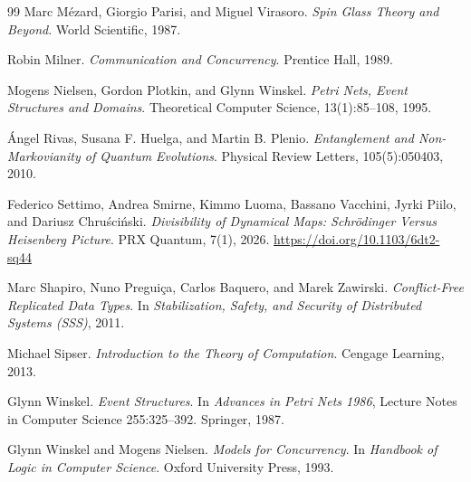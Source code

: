 \documentclass[12pt]{article}
\begin{document}
\begin{thebibliography}{99}
Marc M\'ezard, Giorgio Parisi, and Miguel Virasoro.
\textit{Spin Glass Theory and Beyond}.
World Scientific, 1987.

Robin Milner.
\textit{Communication and Concurrency}.
Prentice Hall, 1989.

Mogens Nielsen, Gordon Plotkin, and Glynn Winskel.
\textit{Petri Nets, Event Structures and Domains}.
Theoretical Computer Science, 13(1):85--108, 1995.

\'Angel Rivas, Susana F. Huelga, and Martin B. Plenio.
\textit{Entanglement and Non-Markovianity of Quantum Evolutions}.
Physical Review Letters, 105(5):050403, 2010.

Federico Settimo, Andrea Smirne, Kimmo Luoma, Bassano Vacchini,
Jyrki Piilo, and Dariusz Chru\'sci\'nski.
\textit{Divisibility of Dynamical Maps: Schr{\"o}dinger Versus Heisenberg Picture}.
PRX Quantum, 7(1), 2026.
\url{https://doi.org/10.1103/6dt2-sq44}

Marc Shapiro, Nuno Preguiça, Carlos Baquero, and Marek Zawirski.
\textit{Conflict-Free Replicated Data Types}.
In \textit{Stabilization, Safety, and Security of Distributed Systems (SSS)}, 2011.

Michael Sipser.
\textit{Introduction to the Theory of Computation}.
Cengage Learning, 2013.

Glynn Winskel.
\textit{Event Structures}.
In \textit{Advances in Petri Nets 1986}, Lecture Notes in Computer Science 255:325--392.
Springer, 1987.

Glynn Winskel and Mogens Nielsen.
\textit{Models for Concurrency}.
In \textit{Handbook of Logic in Computer Science}.
Oxford University Press, 1993.

\end{thebibliography}
\end{document}
